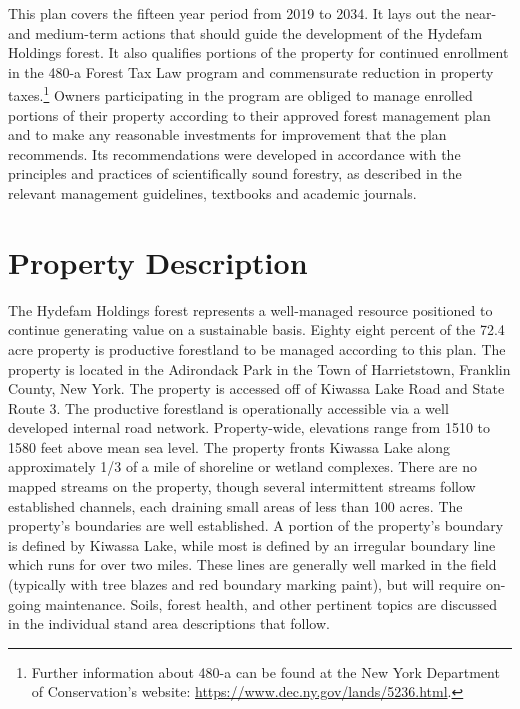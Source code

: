 \documentclass[]{tufte-handout}
\begin{document}
This plan covers the fifteen year period from 2019 to 2034. It lays out
the near- and medium-term actions that should guide the development of
the Hydefam Holdings forest. It also qualifies portions of the property
for continued enrollment in the 480-a Forest Tax Law program and
commensurate reduction in property taxes.\footnote{Further information
  about 480-a can be found at the New York Department of Conservation's
  website: \url{https://www.dec.ny.gov/lands/5236.html}. \vspace{20pt}}
Owners participating in the program are obliged to manage enrolled
portions of their property according to their approved forest management
plan and to make any reasonable investments for improvement that the
plan recommends. Its recommendations were developed in accordance with
the principles and practices of scientifically sound forestry, as
described in the relevant management guidelines, textbooks and academic
journals.

\section{Property Description}\label{property-description}

The Hydefam Holdings forest represents a well-managed resource
positioned to continue generating value on a sustainable basis. Eighty
eight percent of the 72.4 acre property is productive forestland to be
managed according to this plan. The property is located in the
Adirondack Park in the Town of Harrietstown, Franklin County, New York.
The property is accessed off of Kiwassa Lake Road and State Route 3. The
productive forestland is operationally accessible via a well developed
internal road network. Property-wide, elevations range from 1510 to 1580
feet above mean sea level. The property fronts Kiwassa Lake along
approximately 1/3 of a mile of shoreline or wetland complexes. There are
no mapped streams on the property, though several intermittent streams
follow established channels, each draining small areas of less than 100
acres. The property's boundaries are well established. A portion of the
property's boundary is defined by Kiwassa Lake, while most is defined by
an irregular boundary line which runs for over two miles. These lines
are generally well marked in the field (typically with tree blazes and
red boundary marking paint), but will require on-going maintenance.
Soils, forest health, and other pertinent topics are discussed in the
individual stand area descriptions that follow.
\end{document}
